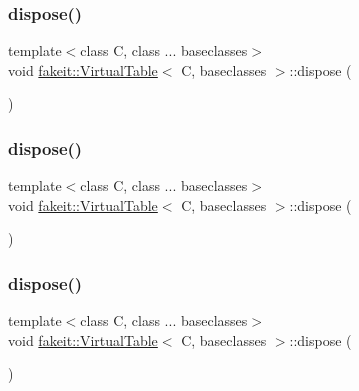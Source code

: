 \subsubsection{\texorpdfstring{dispose()}{dispose()}\hspace{0.1cm}{\footnotesize\ttfamily [6/10]}}
{\footnotesize\ttfamily template$<$class C, class ... baseclasses$>$ \\
void \mbox{\hyperlink{structfakeit_1_1VirtualTable}{fakeit\+::\+Virtual\+Table}}$<$ C, baseclasses $>$\+::dispose (\begin{DoxyParamCaption}{ }\end{DoxyParamCaption})\hspace{0.3cm}{\ttfamily [inline]}}

\mbox{\label{structfakeit_1_1VirtualTable_a58c2bfa93deb68aba5eced688c168e66}} 
\subsubsection{\texorpdfstring{dispose()}{dispose()}\hspace{0.1cm}{\footnotesize\ttfamily [7/10]}}
{\footnotesize\ttfamily template$<$class C, class ... baseclasses$>$ \\
void \mbox{\hyperlink{structfakeit_1_1VirtualTable}{fakeit\+::\+Virtual\+Table}}$<$ C, baseclasses $>$\+::dispose (\begin{DoxyParamCaption}{ }\end{DoxyParamCaption})\hspace{0.3cm}{\ttfamily [inline]}}

\mbox{\label{structfakeit_1_1VirtualTable_a58c2bfa93deb68aba5eced688c168e66}} 
\subsubsection{\texorpdfstring{dispose()}{dispose()}\hspace{0.1cm}{\footnotesize\ttfamily [8/10]}}
{\footnotesize\ttfamily template$<$class C, class ... baseclasses$>$ \\
void \mbox{\hyperlink{structfakeit_1_1VirtualTable}{fakeit\+::\+Virtual\+Table}}$<$ C, baseclasses $>$\+::dispose (\begin{DoxyParamCaption}{ }\end{DoxyParamCaption})\hspace{0.3cm}{\ttfamily [inline]}}

